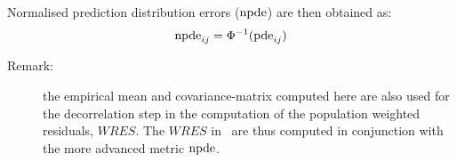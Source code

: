 Normalised prediction distribution errors (${\rm npde}$) are then obtained as:
\begin{equation}
{\rm npde}_{ij} = \Phi^{-1} ({\rm pde}_{ij})
\end{equation}

\begin{description}
\item[Remark:] the empirical mean and covariance-matrix computed here are also used for the decorrelation step in the computation of the population weighted residuals, $WRES$. The $WRES$ in \monolix ~are thus computed in conjunction with the more advanced metric ${\rm npde}$.
\end{description}

